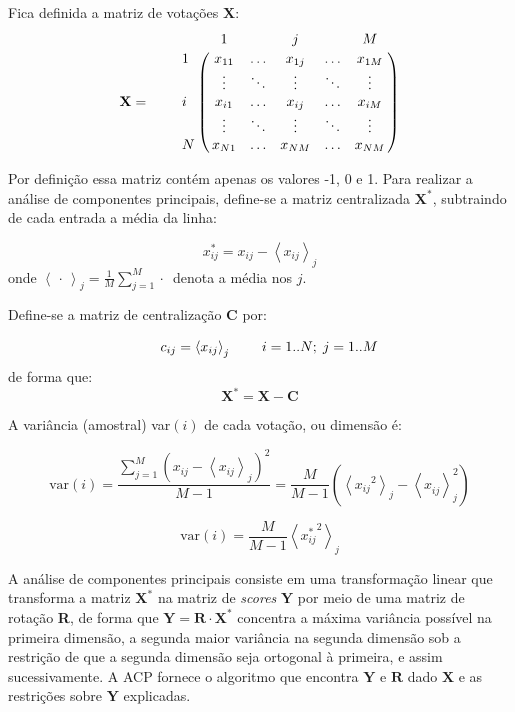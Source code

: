 \documentclass[a4paper, 12pt]{article}
\newcommand{\tikzmark}[1]{\tikz[overlay, remember picture] \coordinate (#1);}
\let\bbordermatrix\bordermatrix
\begin{document}
Fica definida a matriz de votações $\mathbf{X}$:
\medskip{}
\[
  \mathbf{X} = \qquad \bbordermatrix{~  & \tikzmark{harrowleft} 1 & ~ & j & ~
                        & M\tikzmark{harrowright}  \cr
                    \tikzmark{varrowtop} 
                    1 & x_{11} & \ldots & x_{1j} & \ldots & x_{1M} \cr
                    ~ & \vdots & \ddots & \vdots & \ddots & \vdots \cr
                    i & x_{i1} & \ldots & x_{ij} & \ldots & x_{iM} \cr
                    ~ & \vdots & \ddots & \vdots & \ddots & \vdots \cr
                    \tikzmark{varrowbottom}
                    N & x_{N1} & \ldots & x_{NM} & \ldots & x_{NM} \cr
                    }
\]

Por definição essa matriz contém apenas os valores -1, 0 e 1. Para realizar a análise de componentes principais, define-se a matriz centralizada $\mathbf{X^{*}}$, subtraindo de cada entrada a média da linha:

\begin{equation}
  x_{ij}^{*} = x_{ij} - \left< x_{ij} \right>_j 
  \label{eq:x-estrela}
\end{equation}
onde $\left< \,\cdot\, \right>_j = \frac{1}{M}\sum_{j=1}^{M} \cdot\,$ denota a média nos $j$.

Define-se a matriz de centralização $\mathbf{C}$ por:

\[
  \begin{array}{r r r r}
    ~ & c_{ij} = \left< x_{ij} \right>_{j} & ~ & i=1..N;\;j=1..M \\
  \end{array}
\]
de forma que:
\[
  \mathbf{X^{*}} = \mathbf{X} - \mathbf{C}
\]

A variância (amostral) var$(i)$ de cada votação, ou dimensão é:

\[
\mathrm{var}(i) = \frac{\sum_{j=1}^M \left( x_{ij} - \left< x_{ij} \right>_j \right)^2 }{M-1}
= \frac{M}{M-1}\left(\left< {x_{ij}}^{2} \right>_{j} - \left< x_{ij}^{~}\right>_{j}^{2} \right)
\]

\begin{equation}
\mathrm{var}(i) = \frac{M}{M-1}\left<{x_{ij}^{*}}^{2}\right>_{j}
\label{eq:variancia}
\end{equation}

A análise de componentes principais consiste em uma transformação linear que transforma a matriz $\mathbf{X^{*}}$ na matriz de \emph{scores} $\mathbf{Y}$ por meio de uma matriz de rotação \textbf{R}, de forma que  $\mathbf{Y} = \mathbf{R}\cdot \mathbf{X^{*}}$ concentra a máxima variância possível na primeira dimensão, a segunda maior variância na segunda dimensão sob a restrição de que a segunda dimensão seja ortogonal à primeira, e assim sucessivamente. A ACP fornece o algoritmo que encontra $\mathbf{Y}$ e $\mathbf{R}$ dado $\mathbf{X}$ e as restrições sobre $\mathbf{Y}$ explicadas. 
\end{document}
